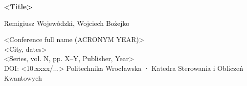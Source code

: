 \documentclass[11pt]{article}
\begin{document}
\vspace*{15mm}
\begin{center}
{\LARGE\bfseries <Title>\par}
\vspace{10mm}
{\large Remigiusz Wojewódzki, Wojciech Bożejko\par}
\vspace{8mm}
<Conference full name (ACRONYM YEAR)>\\
<City, dates>\\[3mm]
<Series, vol. N, pp. X--Y, Publisher, Year>\\[3mm]
DOI: <10.xxxx/...>
\vfill
\vfill
Politechnika Wrocławska · Katedra Sterowania i Obliczeń Kwantowych
\end{center}
\end{document}
